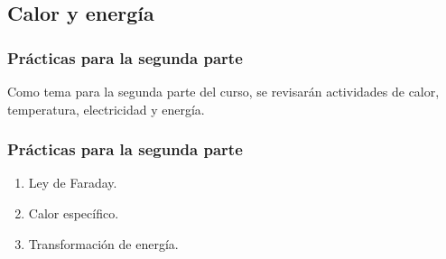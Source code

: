 \documentclass[14pt]{beamer}
\begin{document}
\subsection{Calor y energía}

\begin{frame}
\frametitle{Prácticas para la segunda parte}
Como tema para la segunda parte del curso, se revisarán actividades de calor, temperatura, electricidad y energía.
\end{frame}
\begin{frame}
\frametitle{Prácticas para la segunda parte}
\begin{enumerate}[<+->]
\item Ley de Faraday.
\item Calor específico.
\item Transformación de energía.
\end{enumerate}
\end{frame}


\end{document}
